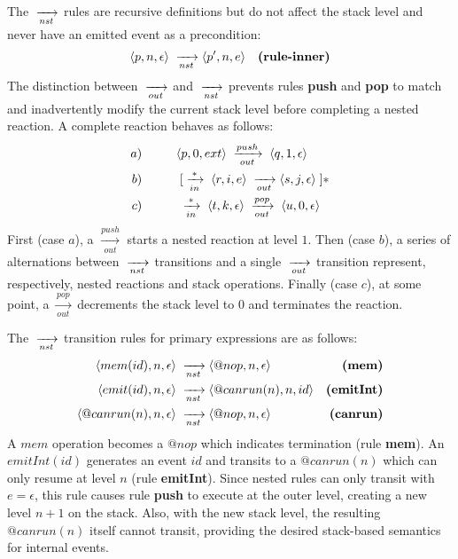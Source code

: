 The $\;\xrightarrow[nst]{\;}$ rules are recursive definitions but do not affect the stack level
and never have an emitted event as a precondition:
%
\begin{align*}
\langle p, n,\epsilon \rangle &\;\xrightarrow[nst]{\;}
\langle p',n,e        \rangle
    & \textbf{(rule-inner)}
\end{align*}
%
The distinction between $\;\xrightarrow[out]{\;}$ and $\;\xrightarrow[nst]{\;}$ prevents rules \textbf{push} and
\textbf{pop} to match and inadvertently modify the current stack level before
completing a nested reaction.
%
A complete reaction behaves as follows:
%
\begin{align*}
a) &\;\;\;\;\;\;\;\;\;\;
    \langle p,0,ext \rangle
        \;\xrightarrow[out]{push}\;
    \langle q,1,\epsilon \rangle
\\
b) &\;\;\;\;\;\;\;\;\;\; \;[ \;\xrightarrow[in]{*}\;
    \langle r,i,e \rangle
        \;\xrightarrow[out]{\;}
    \langle s,j,\epsilon \rangle \;]*
\\
c) &\;\;\;\;\;\;\;\;\;\; \;\xrightarrow[in]{*}\;
    \langle t,k,\epsilon \rangle
        \;\xrightarrow[out]{pop}\;
    \langle u,0,\epsilon \rangle
\end{align*}
%
First (case $a$), a $\xrightarrow[out]{push}$ starts a nested reaction at level
$1$.
Then (case $b$), a series of alternations between $\;\xrightarrow[nst]{\;}$ transitions and a
single $\;\xrightarrow[out]{\;}$ transition represent, respectively, nested reactions and stack
operations.
Finally (case $c$), at some point, a $\xrightarrow[out]{pop}$ decrements the
stack level to $0$ and terminates the reaction.

The $\;\xrightarrow[nst]{\;}$ transition rules for primary expressions are as follows:
%
{ \setlength{\jot}{20pt}
\begin{align*}
\langle mem(id), n, \epsilon \rangle &\;\xrightarrow[nst]{\;}
\langle @nop, n, \epsilon \rangle
    & \textbf{(mem)}        \\
\langle emit(id), n, \epsilon \rangle &\;\xrightarrow[nst]{\;}
\langle @canrun(n), n, id \rangle
    & \textbf{(emitInt)}    \\
\langle @canrun(n), n, \epsilon \rangle &\;\xrightarrow[nst]{\;}
\langle @nop, n, \epsilon \rangle
    & \textbf{(canrun)}     \\
\end{align*}
}
%
A $mem$ operation becomes a $@nop$ which indicates termination (rule
\textbf{mem}).
An $emitInt(id)$ generates an event $id$ and transits to a $@canrun(n)$ which
can only resume at level $n$ (rule \textbf{emitInt}).
Since nested rules can only transit with $e=\epsilon$, this rule causes rule
\textbf{push} to execute at the outer level, creating a new level $n+1$ on
the stack.
Also, with the new stack level, the resulting $@canrun(n)$ itself cannot
transit, providing the desired stack-based semantics for internal events.

